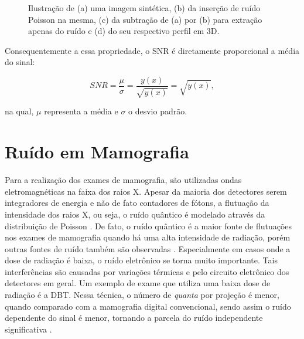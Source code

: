 \begin{figure}[H]
	\centering
	
	\caption{Ilustração de (a) uma imagem sintética, (b) da inserção de ruído Poisson na mesma, (c) da subtração de (a) por (b) para extração apenas do ruído e (d) do seu respectivo perfil em \acs{3D}.}
	
	\hfill
	\hfill
	\hfill
	
	\label{fig:imgCapRuidoPoisson}
\end{figure}

Consequentemente a essa propriedade, o \acs{SNR} é diretamente proporcional a média do sinal:

\begin{equation}
SNR =  \dfrac{\mu}{\sigma} =  \dfrac{y(x)}{\sqrt{y(x)}}  = \sqrt{y(x)},
\label{eq:eqCapRuidoQuanticoSNR}
\end{equation}

\noindent na qual, $\mu$ representa a média e $\sigma$ o desvio padrão.

\section{Ruído em Mamografia}\label{Capitulo4:RuidoemMamografia}

Para a realização dos exames de mamografia, são utilizadas ondas eletromagnéticas na faixa dos raios X. Apesar da maioria dos detectores serem integradores de energia e não de fato contadores de fótons, a flutuação da intensidade dos raios X, ou seja, o ruído quântico é modelado através da distribuição de Poisson \cite{boone2000handbook,haus2000screen}. De fato, o ruído quântico é a maior fonte de flutuações nos exames de mamografia quando há uma alta intensidade de radiação, porém outras fontes de ruído também são observadas \cite{huda2003experimental,marshall2017handbook}. Especialmente em casos onde a dose de radiação é baixa, o ruído eletrônico se torna muito importante. Tais interferências são causadas por variações térmicas e pelo circuito eletrônico dos detectores em geral. Um exemplo de exame que utiliza uma baixa dose de radiação é a \acs{DBT}. Nessa técnica, o número de \textit{quanta} por projeção é menor, quando comparado com a mamografia digital convencional, sendo assim o ruído dependente do sinal é menor, tornando a parcela do ruído independente significativa \cite{sechopoulos2013review,vedantham2015digital}. 

